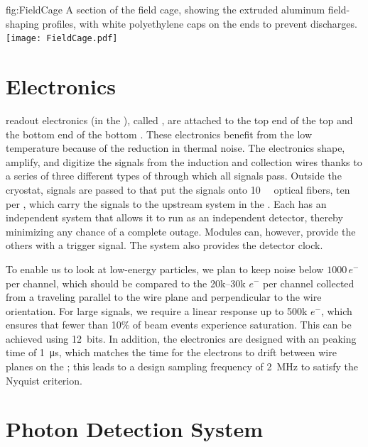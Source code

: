 \begin{dunefigure}{fig:FieldCage}
{A section of the field cage, showing the extruded aluminum field-shaping profiles, with white polyethylene caps on the ends to prevent discharges.}
\texttt{[image: FieldCage.pdf]}
\end{dunefigure}

\section{Electronics}
\label{sec:exec-sp-electronics}

 readout electronics (in the ), called , are attached to the top end of the top  and the bottom end of the bottom . These  electronics benefit from the low  temperature because of the reduction in thermal noise. The  electronics shape, amplify, and digitize the signals from the  induction and collection wires thanks to a series of three different types of  through which all signals pass. 
Outside the cryostat, signals are passed to  that put the signals onto \SI{10}{\giga\byte} optical fibers, ten per , which carry the signals to the upstream  system in the . Each  has an independent  system that allows it to run as an independent detector, thereby minimizing any chance of a complete  outage. Modules can, however, provide the others with a  trigger signal. The  system also provides the detector clock. 

To enable us to look at low-energy particles, we plan to keep noise below $1000\,e^{-}$ per channel, which should be compared to the 20k--30k $e^{-}$ per channel collected from a  traveling parallel to the wire plane and perpendicular to the wire orientation. For large signals, we require a linear response up to 500k $e^{-}$, which ensures that fewer than 10\% of beam events experience saturation. This can be achieved using 12\,  bits. In addition, the electronics are designed with an  peaking time of \SI{1}{\micro\second}, which matches the time for the electrons to drift between wire planes on the ; this leads to a design sampling frequency of \SI{2}{\mega\hertz} to satisfy the Nyquist criterion.

\section{Photon Detection System}
\label{sec:fdsp-exec-pds}


